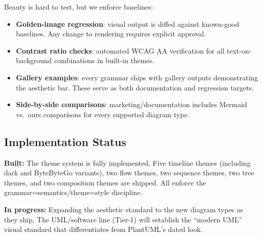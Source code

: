 Beauty is hard to test, but we enforce baselines:

\begin{itemize}
  \item \textbf{Golden-image regression}: visual output is diffed against known-good
        baselines. Any change to rendering requires explicit approval.
  \item \textbf{Contrast ratio checks}: automated WCAG AA verification for all
        text-on-background combinations in built-in themes.
  \item \textbf{Gallery examples}: every grammar ships with gallery outputs demonstrating
        the aesthetic bar. These serve as both documentation and regression targets.
  \item \textbf{Side-by-side comparisons}: marketing/documentation includes Mermaid vs.\
        ours comparisons for every supported diagram type.
\end{itemize}

\subsection{Implementation Status}

\textbf{Built:} The theme system is fully implemented. Five timeline themes (including dark
and ByteByteGo variants), two flow themes, two sequence themes, two tree themes, and two
composition themes are shipped. All enforce the grammar=semantics/theme=style discipline.

\textbf{In progress:} Expanding the aesthetic standard to the new diagram types as they
ship. The UML/software line (Tier-1) will establish the ``modern UML'' visual standard
that differentiates from PlantUML's dated look.
